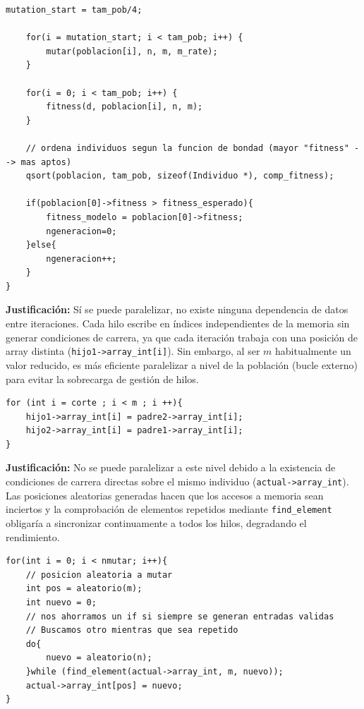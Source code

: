 \documentclass[12pt]{article}
\begin{document}
\begin{enumerate}
\begin{lstlisting}[style=EstiloC]
    mutation_start = tam_pob/4;
    
    for(i = mutation_start; i < tam_pob; i++) {
        mutar(poblacion[i], n, m, m_rate);
    }
    
    for(i = 0; i < tam_pob; i++) {
        fitness(d, poblacion[i], n, m);
    }
    
    // ordena individuos segun la funcion de bondad (mayor "fitness" --> mas aptos)
    qsort(poblacion, tam_pob, sizeof(Individuo *), comp_fitness);
        
    if(poblacion[0]->fitness > fitness_esperado){
        fitness_modelo = poblacion[0]->fitness;
        ngeneracion=0;
    }else{
        ngeneracion++;
    }       
}
\end{lstlisting}

\vspace{0.5cm}

\textbf{Justificación:} Sí se puede paralelizar, no existe ninguna dependencia de datos entre iteraciones. Cada hilo escribe en índices independientes de la memoria sin generar condiciones de carrera, ya que cada iteración trabaja con una posición de array distinta (\texttt{hijo1->array\_int[i]}). Sin embargo, al ser $m$ habitualmente un valor reducido, es más eficiente paralelizar a nivel de la población (bucle externo) para evitar la sobrecarga de gestión de hilos.

\begin{lstlisting}[style=EstiloC]
for (int i = corte ; i < m ; i ++){
    hijo1->array_int[i] = padre2->array_int[i];
    hijo2->array_int[i] = padre1->array_int[i];
}
\end{lstlisting}

\vspace{0.5cm}

\textbf{Justificación:} No se puede paralelizar a este nivel debido a la existencia de condiciones de carrera directas sobre el mismo individuo (\texttt{actual->array\_int}). Las posiciones aleatorias generadas hacen que los accesos a memoria sean inciertos y la comprobación de elementos repetidos mediante \texttt{find\_element} obligaría a sincronizar continuamente a todos los hilos, degradando el rendimiento.

\begin{lstlisting}[style=EstiloC]
for(int i = 0; i < nmutar; i++){
    // posicion aleatoria a mutar
    int pos = aleatorio(m);
    int nuevo = 0;
    // nos ahorramos un if si siempre se generan entradas validas
    // Buscamos otro mientras que sea repetido
    do{
        nuevo = aleatorio(n);
    }while (find_element(actual->array_int, m, nuevo));
    actual->array_int[pos] = nuevo;
}
\end{lstlisting}


\end{enumerate}
\end{document}
